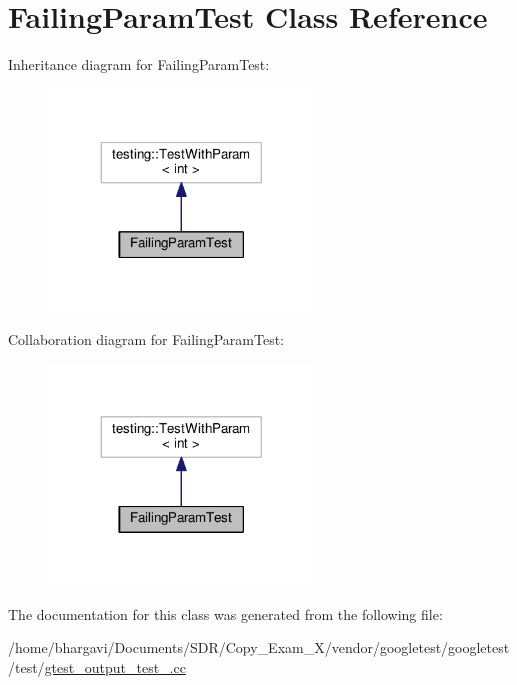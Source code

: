 \hypertarget{class_failing_param_test}{}\section{Failing\+Param\+Test Class Reference}
\label{class_failing_param_test}


Inheritance diagram for Failing\+Param\+Test\+:
\nopagebreak
\begin{figure}[H]
\begin{center}
\leavevmode
\includegraphics[width=200pt]{class_failing_param_test__inherit__graph}
\end{center}
\end{figure}


Collaboration diagram for Failing\+Param\+Test\+:
\nopagebreak
\begin{figure}[H]
\begin{center}
\leavevmode
\includegraphics[width=200pt]{class_failing_param_test__coll__graph}
\end{center}
\end{figure}


The documentation for this class was generated from the following file\+:\begin{DoxyCompactItemize}
\item 
/home/bhargavi/\+Documents/\+S\+D\+R/\+Copy\+\_\+\+Exam\+\_\+X/vendor/googletest/googletest/test/\hyperlink{gtest__output__test___8cc}{gtest\+\_\+output\+\_\+test\+\_\+.\+cc}\end{DoxyCompactItemize}
